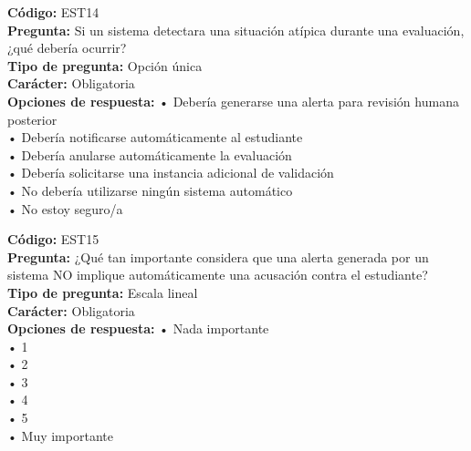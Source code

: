 \begin{infobox}\small
\textbf{\textcolor{accent}{Código:}} EST14\\
\textbf{\textcolor{accent}{Pregunta:}} Si un sistema detectara una situación atípica durante una evaluación, ¿qué debería ocurrir?\\
\textbf{\textcolor{accent}{Tipo de pregunta:}} Opción única\\
\textbf{\textcolor{accent}{Carácter:}} Obligatoria\\
\textbf{\textcolor{accent}{Opciones de respuesta:}} • Debería generarse una alerta para revisión humana posterior \\ • Debería notificarse automáticamente al estudiante \\ • Debería anularse automáticamente la evaluación \\ • Debería solicitarse una instancia adicional de validación \\ • No debería utilizarse ningún sistema automático \\ • No estoy seguro/a\\
\end{infobox}
\begin{infobox}\small
\textbf{\textcolor{accent}{Código:}} EST15\\
\textbf{\textcolor{accent}{Pregunta:}} ¿Qué tan importante considera que una alerta generada por un sistema NO implique automáticamente una acusación contra el estudiante?\\
\textbf{\textcolor{accent}{Tipo de pregunta:}} Escala lineal\\
\textbf{\textcolor{accent}{Carácter:}} Obligatoria\\
\textbf{\textcolor{accent}{Opciones de respuesta:}} • Nada importante \\ • 1 \\ • 2 \\ • 3 \\ • 4 \\ • 5 \\ • Muy importante\\
\end{infobox}
